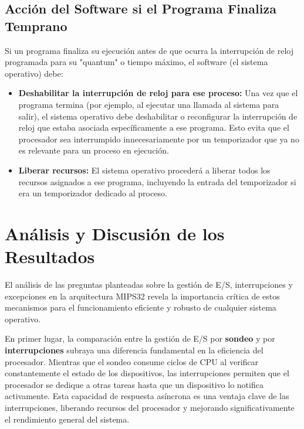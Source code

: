 \documentclass[12pt,a4paper]{article}
\begin{document}
	\subsection{Acción del Software si el Programa Finaliza Temprano}
	Si un programa finaliza su ejecución antes de que ocurra la interrupción de reloj programada para su "quantum" o tiempo máximo, el software (el sistema operativo) debe:
	
	\begin{itemize}
		\item \textbf{Deshabilitar la interrupción de reloj para ese proceso:} Una vez que el programa termina (por ejemplo, al ejecutar una llamada al sistema para salir), el sistema operativo debe deshabilitar o reconfigurar la interrupción de reloj que estaba asociada específicamente a ese programa. Esto evita que el procesador sea interrumpido innecesariamente por un temporizador que ya no es relevante para un proceso en ejecución.
		\item \textbf{Liberar recursos:} El sistema operativo procederá a liberar todos los recursos asignados a ese programa, incluyendo la entrada del temporizador si era un temporizador dedicado al proceso.
	\end{itemize}
	
	
	\section{Análisis y Discusión de los Resultados}
	
	El análisis de las preguntas planteadas sobre la gestión de E/S, interrupciones y excepciones en la arquitectura MIPS32 revela la importancia crítica de estos mecanismos para el funcionamiento eficiente y robusto de cualquier sistema operativo.
	
	En primer lugar, la comparación entre la gestión de E/S por \textbf{sondeo} y por \textbf{interrupciones} subraya una diferencia fundamental en la eficiencia del procesador. Mientras que el sondeo consume ciclos de CPU al verificar constantemente el estado de los dispositivos, las interrupciones permiten que el procesador se dedique a otras tareas hasta que un dispositivo lo notifica activamente. Esta capacidad de respuesta asíncrona es una ventaja clave de las interrupciones, liberando recursos del procesador y mejorando significativamente el rendimiento general del sistema.
	
\end{document}
